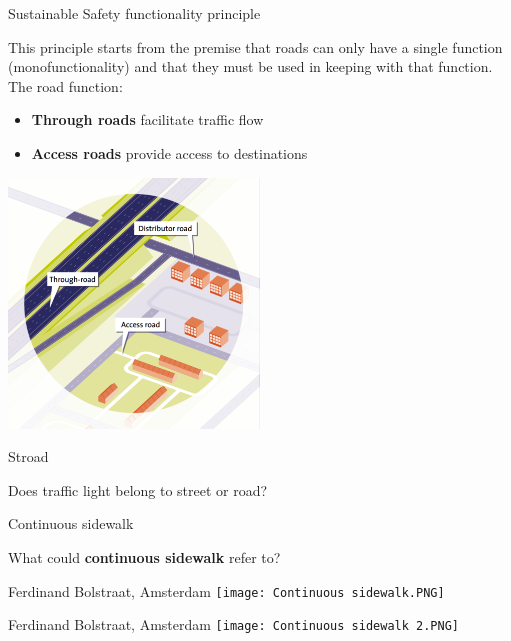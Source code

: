 \documentclass{beamer}
\begin{document}
    \begin{frame}{Sustainable Safety functionality principle}
        \begin{block}{}
            This principle starts from the premise that roads can only have a single function (monofunctionality) and that they must be used in keeping with that function.
            The road function:\\
            \begin{itemize}
                \item \textbf{Through roads} facilitate traffic flow
                \item \textbf{Access roads} provide access to destinations
            \end{itemize}
        \end{block}
        \includegraphics[width = 0.5\textwidth]{Road classification.PNG}
    \end{frame}

    \begin{frame}{Stroad}
        \begin{block}{}
            Does traffic light belong to street or road?
        \end{block}
    \end{frame}

    \begin{frame}{Continuous sidewalk}
        \begin{block}{}
            What could \textbf{continuous sidewalk} refer to?
        \end{block}
    \end{frame}

    \begin{frame}{Ferdinand Bolstraat, Amsterdam}
        \texttt{[image: Continuous sidewalk.PNG]}
    \end{frame}

    \begin{frame}{Ferdinand Bolstraat, Amsterdam}
        \texttt{[image: Continuous sidewalk 2.PNG]}
    \end{frame}
\end{document}

